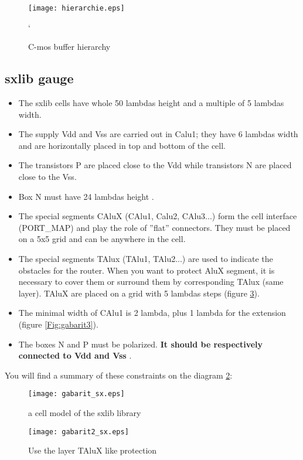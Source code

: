 \documentclass{article}
\begin{document}
\begin{figure}[H]\centering
  \texttt{[image: hierarchie.eps]}
  \caption{C-mos buffer hierarchy}
  \label{Fig:hier_x1}
`\end{figure}

\subsection{sxlib gauge}

\begin{itemize}\itemsep=-.4ex
\item The sxlib cells have whole 50 lambdas height and a multiple of 5 lambdas width.
\item The supply Vdd and Vss are carried out in Calu1; they have 6 lambdas width and are 
horizontally placed in top and bottom of the cell.
\item The transistors P are placed close to the Vdd while transistors N are placed close
        to the Vss.
\item Box N must have 24 lambdas height .
\item The special segments CAluX (CAlu1, Calu2, CAlu3...) form the cell interface (PORT\_MAP) 
and play the role of ''flat'' connectors. They must be placed on a 5x5 grid and can be anywhere in the cell.
\item The special segments TAlux (TAlu1, TAlu2...) are used to indicate the obstacles for the
        router. When you want to protect AluX segment, it is necessary to cover them
        or surround them by corresponding TAlux (same layer). TAluX are placed on a grid
        with 5 lambdas steps (figure \ref{Fig:gabarit2}).
\item The minimal width of CAlu1 is 2 lambda, plus 1 lambda for the extension (figure \ref{Fig:gabarit3}).
\item The boxes N and P must be polarized. { \bf It should be respectively connected to Vdd and Vss }.
\end{itemize}

You will find a summary of these constraints on the diagram 
\ref{Fig:gabarit}:

\begin{figure}[H]\centering
  \texttt{[image: gabarit\_sx.eps]}
  \caption{a cell model of the sxlib library }
  \label{Fig:gabarit}
\end{figure}

\begin{figure}[H]\centering
  \texttt{[image: gabarit2\_sx.eps]}
  \caption{Use the layer TAluX like protection}
  \label{Fig:gabarit2}
\end{figure}
\end{document}
